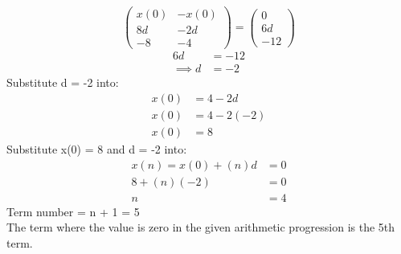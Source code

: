 \documentclass[journal,12pt,twocolumn]{IEEEtran}
\theoremstyle{remark}
\begin{document}
\begin{equation}
\left(
\begin{array}{rr}
x(0) & -x(0) \\
8d & -2d \\
-8 & -4
\end{array}
\right)
=
\left(
\begin{array}{r}
0 \\
6d \\
-12
\end{array}
\right)
\end{equation}
\begin{align}
6d &= -12 \\
\implies d &= -2 
\end{align}
Substitute d = -2 into:
\begin{align}
x(0) &= 4 - 2d\\
x(0) &= 4 - 2(-2)\\
x(0) &= 8
\end{align}
Substitute x(0) = 8 and d = -2 into:
\begin{align}
x(n) = x(0) + (n)d &= 0 \\
8 + (n)(-2) &= 0 \\
n &= 4
\end{align}
Term number = n + 1 = 5 \\
The term where the value is zero in the given arithmetic progression is the 5th term.\\
\end{document}
